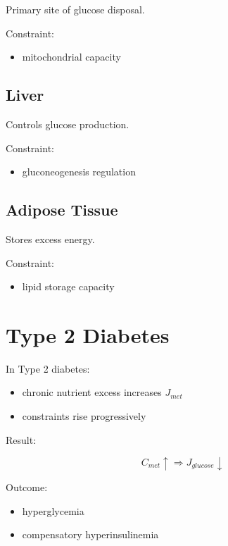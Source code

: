 \documentclass[12pt,a4paper]{article}
\begin{document}
Primary site of glucose disposal.

Constraint:

\begin{itemize}
    \item mitochondrial capacity
\end{itemize}

\subsection{Liver}

Controls glucose production.

Constraint:

\begin{itemize}
    \item gluconeogenesis regulation
\end{itemize}

\subsection{Adipose Tissue}

Stores excess energy.

Constraint:

\begin{itemize}
    \item lipid storage capacity
\end{itemize}

\section{Type 2 Diabetes}

In Type 2 diabetes:

\begin{itemize}
    \item chronic nutrient excess increases $J_{met}$
    \item constraints rise progressively
\end{itemize}

Result:

\begin{equation}
C_{met} \uparrow \Rightarrow J_{glucose} \downarrow
\end{equation}

Outcome:

\begin{itemize}
    \item hyperglycemia
    \item compensatory hyperinsulinemia
\end{itemize}
\end{document}
